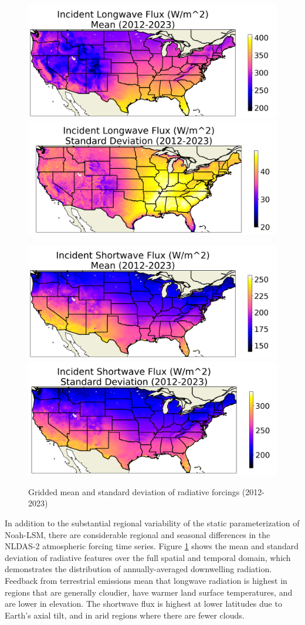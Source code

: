 \begin{figure}[h!]
    \centering
    \includegraphics[width=.48\linewidth,draft=false]{figures/thesis-gridstats/gridstat-bulk_dlwrf_2012-1_2023-12_y000-195_x000-462_mean.png}
    \includegraphics[width=.48\linewidth,draft=false]{figures/thesis-gridstats/gridstat-bulk_dlwrf_2012-1_2023-12_y000-195_x000-462_stdev.png}

    \includegraphics[width=.48\linewidth,draft=false]{figures/thesis-gridstats/gridstat-bulk_dswrf_2012-1_2023-12_y000-195_x000-462_mean.png}
    \includegraphics[width=.48\linewidth,draft=false]{figures/thesis-gridstats/gridstat-bulk_dswrf_2012-1_2023-12_y000-195_x000-462_stdev.png}
    \caption{Gridded mean and standard deviation of radiative forcings (2012-2023)}
    \label{gs-radiative}
\end{figure}

In addition to the substantial regional variability of the static parameterization of Noah-LSM, there are considerable regional and seasonal differences in the NLDAS-2 atmospheric forcing time series. Figure \ref{gs-radiative} shows the mean and standard deviation of radiative features over the full spatial and temporal domain, which demonstrates the distribution of annually-averaged downwelling radiation. Feedback from terrestrial emissions mean that longwave radiation is highest in regions that are generally cloudier, have warmer land surface temperatures, and are lower in elevation. The shortwave flux is highest at lower latitudes due to Earth's axial tilt, and in arid regions where there are fewer clouds.

